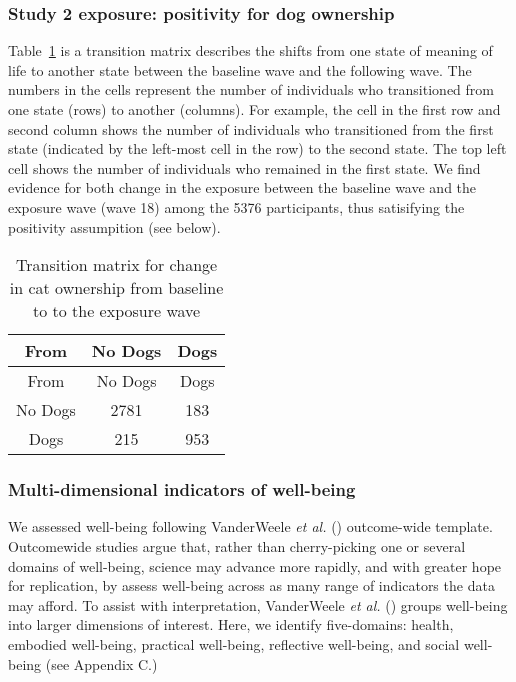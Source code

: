 \documentclass[
  singlecolumn,
  9pt]{article}
\begin{document}
\subsubsection{Study 2 exposure: positivity for dog
ownership}\label{study-2-exposure-positivity-for-dog-ownership}

Table~\ref{tbl-transition-dogs} is a transition matrix describes the
shifts from one state of meaning of life to another state between the
baseline wave and the following wave. The numbers in the cells represent
the number of individuals who transitioned from one state (rows) to
another (columns). For example, the cell in the first row and second
column shows the number of individuals who transitioned from the first
state (indicated by the left-most cell in the row) to the second state.
The top left cell shows the number of individuals who remained in the
first state. We find evidence for both change in the exposure between
the baseline wave and the exposure wave (wave 18) among the 5376
participants, thus satisifying the positivity assumpition (see below).

\begin{longtable}[]{@{}ccc@{}}
\caption{Transition matrix for change in cat ownership from baseline to
to the exposure wave}\label{tbl-transition-dogs}\tabularnewline
\toprule\noalign{}
From & No Dogs & Dogs \\
\midrule\noalign{}
\endfirsthead
\toprule\noalign{}
From & No Dogs & Dogs \\
\midrule\noalign{}
\endhead
\bottomrule\noalign{}
\endlastfoot
No Dogs & 2781 & 183 \\
Dogs & 215 & 953 \\
\end{longtable}

\subsubsection{Multi-dimensional indicators of
well-being}\label{multi-dimensional-indicators-of-well-being}

We assessed well-being following VanderWeele \emph{et al.}
() outcome-wide template.
Outcomewide studies argue that, rather than cherry-picking one or
several domains of well-being, science may advance more rapidly, and
with greater hope for replication, by assess well-being across as many
range of indicators the data may afford. To assist with interpretation,
VanderWeele \emph{et al.} () groups
well-being into larger dimensions of interest. Here, we identify
five-domains: health, embodied well-being, practical well-being,
reflective well-being, and social well-being (see Appendix C.)
\end{document}
